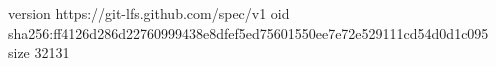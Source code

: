 version https://git-lfs.github.com/spec/v1
oid sha256:ff4126d286d22760999438e8dfef5ed75601550ee7e72e529111cd54d0d1c095
size 32131
